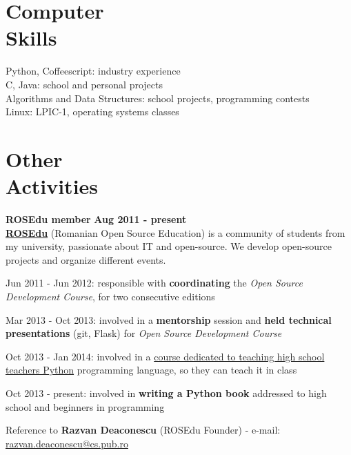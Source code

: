 \documentclass[margin,line]{resume}
\begin{document}
\begin{resume}
    \section{\mysidestyle Computer\\Skills}

	Python, Coffeescript: industry experience\\
	C, Java: school and personal projects\\
	Algorithms and Data Structures: school projects, programming contests\\
	Linux: LPIC-1, operating systems classes


    \section{\mysidestyle Other\\Activities}

    \vspace{1.2mm}\textbf{ROSEdu member} \hfill \textbf{Aug 2011 - present} \vspace{1.5mm}\\
	\href{http://rosedu.org/}{\textbf{ROSEdu}} (Romanian Open Source Education) is a community of
	students from my university, passionate about IT and open-source. We develop
	open-source projects and organize different events.\vspace{1mm}
	\begin{list2}
        \item Jun 2011 - Jun 2012: responsible with \textbf{coordinating} the \textit{Open Source Development Course}, for two consecutive editions
        \item Mar 2013 - Oct 2013: involved in a \textbf{mentorship} session and \textbf{held technical presentations} (git, Flask) for \textit{Open Source Development Course}
        \item Oct 2013 - Jan 2014: involved in a \href{http://py4school.rosedu.org/}{course dedicated to teaching high school teachers Python} programming language, so they can teach it in class
        \item Oct 2013 - present: involved in \textbf{writing a Python book} addressed to high school and beginners in programming
	\end{list2}\vspace{-3mm}
	\small{Reference to \textbf{Razvan Deaconescu} (ROSEdu Founder)
		- e-mail: \href{mailto:razvan.deaconescu@cs.pub.ro}{razvan.deaconescu@cs.pub.ro}}


\end{resume}
\end{document}
